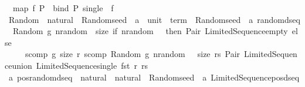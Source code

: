 \begin{isabellebody}
\isanewline
\ \ {\isachardoublequoteopen}map\ f\ P\ {\isacharequal}{\kern0pt}\ bind\ P\ {\isacharparenleft}{\kern0pt}single\ {\isasymcirc}\ f{\isacharparenright}{\kern0pt}{\isachardoublequoteclose}\isanewline
\isanewline
{}\isamarkupfalse%
\ Random\ {\isacharcolon}{\kern0pt}{\isacharcolon}{\kern0pt}\ {\isachardoublequoteopen}{\isacharparenleft}{\kern0pt}natural\ {\isasymRightarrow}\ Random{\isachardot}{\kern0pt}seed\ {\isasymRightarrow}\ {\isacharparenleft}{\kern0pt}{\isacharparenleft}{\kern0pt}{\isacharprime}{\kern0pt}a\ {\isasymtimes}\ {\isacharparenleft}{\kern0pt}unit\ {\isasymRightarrow}\ term{\isacharparenright}{\kern0pt}{\isacharparenright}{\kern0pt}\ {\isasymtimes}\ Random{\isachardot}{\kern0pt}seed{\isacharparenright}{\kern0pt}{\isacharparenright}{\kern0pt}\ {\isasymRightarrow}\ {\isacharprime}{\kern0pt}a\ random{\isacharunderscore}{\kern0pt}dseq{\isachardoublequoteclose}\isanewline
{}\isanewline
\ \ {\isachardoublequoteopen}Random\ g\ nrandom\ {\isacharequal}{\kern0pt}\ {\isacharparenleft}{\kern0pt}{\isacharpercent}{\kern0pt}size{\isachardot}{\kern0pt}\ if\ nrandom\ {\isacharless}{\kern0pt}{\isacharequal}{\kern0pt}\ {}\ then\ {\isacharparenleft}{\kern0pt}Pair\ Limited{\isacharunderscore}{\kern0pt}Sequence{\isachardot}{\kern0pt}empty{\isacharparenright}{\kern0pt}\ else\isanewline
\ \ \ \ \ {\isacharparenleft}{\kern0pt}scomp\ {\isacharparenleft}{\kern0pt}g\ size{\isacharparenright}{\kern0pt}\ {\isacharparenleft}{\kern0pt}{\isacharpercent}{\kern0pt}r{\isachardot}{\kern0pt}\ scomp\ {\isacharparenleft}{\kern0pt}Random\ g\ {\isacharparenleft}{\kern0pt}nrandom\ {\isacharminus}{\kern0pt}\ {}{\isacharparenright}{\kern0pt}\ size{\isacharparenright}{\kern0pt}\ {\isacharparenleft}{\kern0pt}{\isacharpercent}{\kern0pt}rs{\isachardot}{\kern0pt}\ Pair\ {\isacharparenleft}{\kern0pt}Limited{\isacharunderscore}{\kern0pt}Sequence{\isachardot}{\kern0pt}union\ {\isacharparenleft}{\kern0pt}Limited{\isacharunderscore}{\kern0pt}Sequence{\isachardot}{\kern0pt}single\ {\isacharparenleft}{\kern0pt}fst\ r{\isacharparenright}{\kern0pt}{\isacharparenright}{\kern0pt}\ rs{\isacharparenright}{\kern0pt}{\isacharparenright}{\kern0pt}{\isacharparenright}{\kern0pt}{\isacharparenright}{\kern0pt}{\isacharparenright}{\kern0pt}{\isachardoublequoteclose}\isanewline
\isanewline
\isanewline
{}\isamarkupfalse%
\ {\isacharprime}{\kern0pt}a\ pos{\isacharunderscore}{\kern0pt}random{\isacharunderscore}{\kern0pt}dseq\ {\isacharequal}{\kern0pt}\ {\isachardoublequoteopen}natural\ {\isasymRightarrow}\ natural\ {\isasymRightarrow}\ Random{\isachardot}{\kern0pt}seed\ {\isasymRightarrow}\ {\isacharprime}{\kern0pt}a\ Limited{\isacharunderscore}{\kern0pt}Sequence{\isachardot}{\kern0pt}pos{\isacharunderscore}{\kern0pt}dseq{\isachardoublequoteclose}\isanewline

\end{isabellebody}
